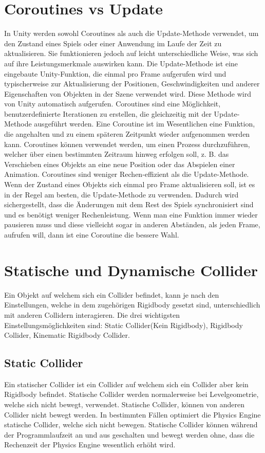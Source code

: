 \section{Coroutines vs Update}
In Unity werden sowohl Coroutines als auch die Update-Methode verwendet, um den Zustand eines Spiels oder einer Anwendung im Laufe der Zeit zu aktualisieren. Sie funktionieren jedoch auf leicht unterschiedliche Weise, was sich auf ihre Leistungsmerkmale auswirken kann. Die Update-Methode ist eine eingebaute Unity-Funktion, die einmal pro Frame aufgerufen wird und typischerweise zur Aktualisierung der Positionen, Geschwindigkeiten und anderer Eigenschaften von Objekten in der Szene verwendet wird. Diese Methode wird von Unity automatisch aufgerufen. Coroutines sind eine Möglichkeit, benutzerdefinierte Iterationen zu erstellen, die gleichzeitig mit der Update-Methode ausgeführt werden. Eine Coroutine ist im Wesentlichen eine Funktion, die angehalten und zu einem späteren Zeitpunkt wieder aufgenommen werden kann. Coroutines können verwendet werden, um einen Prozess durchzuführen, welcher über einen bestimmten Zeitraum hinweg erfolgen soll, z. B. das Verschieben eines Objekts an eine neue Position oder das Abspielen einer Animation. Coroutines sind weniger Rechen-effizient als die Update-Methode. Wenn der Zustand eines Objekts sich einmal pro Frame aktualisieren soll, ist es in der Regel am besten, die Update-Methode zu verwenden. Dadurch wird sichergestellt, dass die Änderungen mit dem Rest des Spiels synchronisiert sind und es benötigt weniger Rechenleistung. Wenn man eine Funktion immer wieder pausieren muss und diese vielleicht sogar in anderen Abständen, als jeden Frame, aufrufen will, dann ist eine Coroutine die bessere Wahl.
\cite{dickinson2015unity}

\section{Statische und Dynamische Collider}
Ein Objekt auf welchem sich ein Collider befindet, kann je nach den Einstellungen, welche in dem zugehörigen Rigidbody gesetzt sind, unterschiedlich mit anderen Collidern interagieren. Die drei wichtigsten Einstellungsmöglichkeiten sind: Static Collider(Kein Rigidbody), Rigidbody Collider, Kinematic Rigidbody Collider.

\subsection{Static Collider}
Ein statischer Collider ist ein Collider auf welchem sich ein Collider aber kein Rigidbody befindet. Statische Collider werden normalerweise bei Levelgeometrie, welche sich nicht bewegt, verwendet. Statische Collider, können von anderen Collider nicht bewegt werden. In bestimmten Fällen optimiert die Physics Engine statische Collider, welche sich nicht bewegen. Statische Collider können während der Programmlaufzeit an und aus geschalten und bewegt werden ohne, dass die Rechenzeit der Physics Engine wesentlich erhöht wird.

